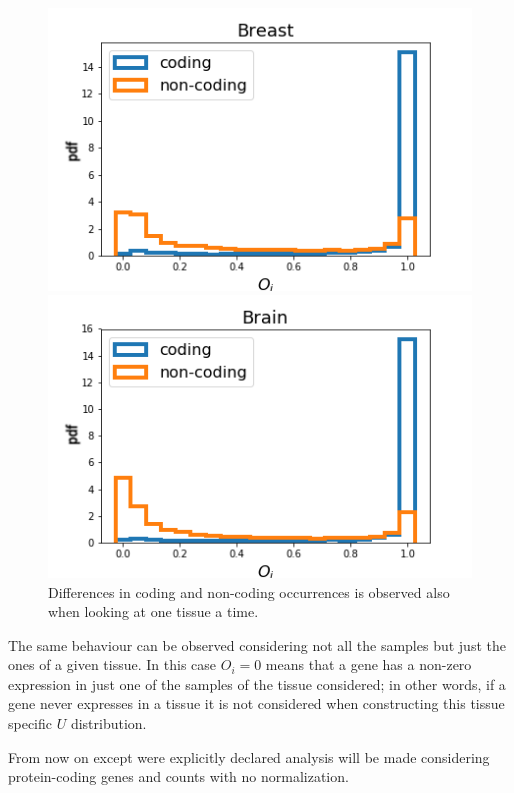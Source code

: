 \begin{figure}[htb!]
    \centering
    \begin{minipage}{0.45\textwidth}
    \includegraphics[width=0.95\linewidth]{pictures/structure/gtex/U_Breast.png}
    \end{minipage}
    \hspace{2mm}
    \begin{minipage}{0.45\textwidth}
    \includegraphics[width=0.95\linewidth]{pictures/structure/gtex/U_Brain.png}
    \end{minipage}
    \caption{Differences in coding and non-coding occurrences is observed also when looking at one tissue a time.}
    \label{fig:structure/gtex/U_tissues}
\end{figure}

The same behaviour can be observed considering not all the samples but just the ones of a given tissue. In this case $O_i=0$ means that a gene has a non-zero expression in just one of the samples of the tissue considered; in other words, if a gene never expresses in a tissue it is not considered when constructing this tissue specific $U$ distribution.

From now on except were explicitly declared analysis will be made considering protein-coding genes and counts with no normalization.